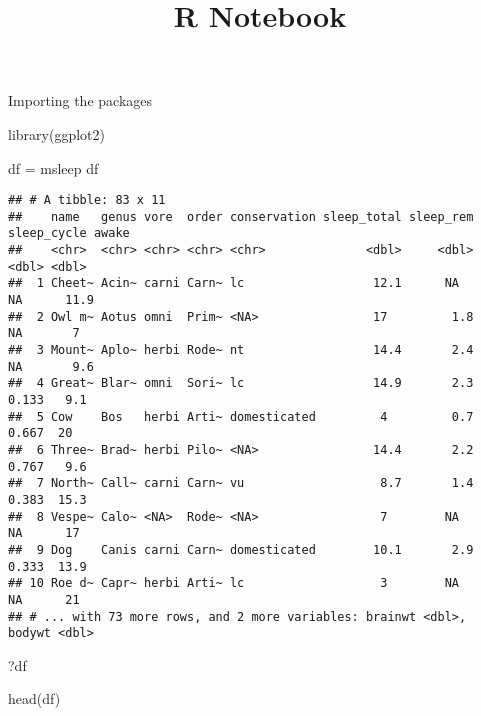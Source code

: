 \documentclass[
]{article}
\title{R Notebook}
\author{}
\date{\vspace{-2.5em}}
\newenvironment{Shaded}{\begin{snugshade}}{\end{snugshade}}
\newcommand{\FunctionTok}[1]{\textcolor[rgb]{0.00,0.00,0.00}{#1}}
\newcommand{\NormalTok}[1]{#1}
\newcommand{\OtherTok}[1]{\textcolor[rgb]{0.56,0.35,0.01}{#1}}
\begin{document}
\maketitle

Importing the packages

\begin{Shaded}
\begin{Highlighting}[]
\FunctionTok{library}\NormalTok{(ggplot2)}
\end{Highlighting}
\end{Shaded}

\begin{Shaded}
\begin{Highlighting}[]
\NormalTok{df }\OtherTok{=}\NormalTok{ msleep}
\NormalTok{df}
\end{Highlighting}
\end{Shaded}

\begin{verbatim}
## # A tibble: 83 x 11
##    name   genus vore  order conservation sleep_total sleep_rem sleep_cycle awake
##    <chr>  <chr> <chr> <chr> <chr>              <dbl>     <dbl>       <dbl> <dbl>
##  1 Cheet~ Acin~ carni Carn~ lc                  12.1      NA        NA      11.9
##  2 Owl m~ Aotus omni  Prim~ <NA>                17         1.8      NA       7  
##  3 Mount~ Aplo~ herbi Rode~ nt                  14.4       2.4      NA       9.6
##  4 Great~ Blar~ omni  Sori~ lc                  14.9       2.3       0.133   9.1
##  5 Cow    Bos   herbi Arti~ domesticated         4         0.7       0.667  20  
##  6 Three~ Brad~ herbi Pilo~ <NA>                14.4       2.2       0.767   9.6
##  7 North~ Call~ carni Carn~ vu                   8.7       1.4       0.383  15.3
##  8 Vespe~ Calo~ <NA>  Rode~ <NA>                 7        NA        NA      17  
##  9 Dog    Canis carni Carn~ domesticated        10.1       2.9       0.333  13.9
## 10 Roe d~ Capr~ herbi Arti~ lc                   3        NA        NA      21  
## # ... with 73 more rows, and 2 more variables: brainwt <dbl>, bodywt <dbl>
\end{verbatim}

\begin{Shaded}
\begin{Highlighting}[]
\NormalTok{?df}
\end{Highlighting}
\end{Shaded}

\begin{Shaded}
\begin{Highlighting}[]
\FunctionTok{head}\NormalTok{(df)}
\end{Highlighting}
\end{Shaded}
\end{document}
